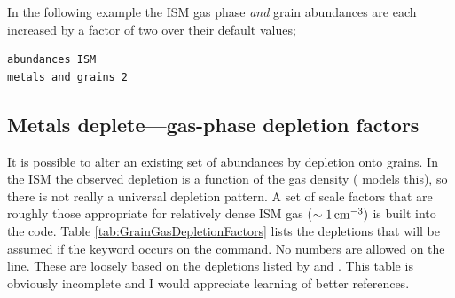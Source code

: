 In the following example the ISM gas phase \emph{and}
grain abundances are each
increased by a factor of two over their default values;
\begin{verbatim}
abundances ISM
metals and grains 2
\end{verbatim}

\subsection{Metals deplete---gas-phase depletion factors}

It is possible to alter an existing set of abundances by depletion onto
grains.
In the ISM the observed depletion is a function of the gas density
(\citealp{Spitzer1985} models this), so there is not really a universal depletion
pattern.  A set of scale factors that are roughly those appropriate for
relatively dense ISM gas ($\sim 1 {\rm\thinspace cm^{-3}})$ is built into the code.
Table \ref{tab:GrainGasDepletionFactors} lists
the depletions that will be assumed if the keyword
 occurs on the
 command. No numbers are allowed on the line.
These are loosely based
on the depletions listed by \citet{Jenkins1987} and \citet{Cowie1986}.
This table is obviously incomplete and I would appreciate learning of better references.

